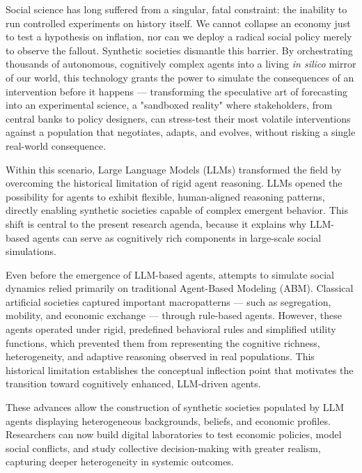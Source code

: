 

Social science has long suffered from a singular, fatal constraint: the inability to run controlled experiments on history itself. We cannot collapse an economy just to test a hypothesis on inflation, nor can we deploy a radical social policy merely to observe the fallout. Synthetic societies dismantle this barrier. By orchestrating thousands of autonomous, cognitively complex agents into a living \textit{in silico} mirror of our world, this technology grants the power to simulate the consequences of an intervention before it happens — transforming the speculative art of forecasting into an experimental science, a "sandboxed reality" where stakeholders, from central banks to policy designers, can stress-test their most volatile interventions against a population that negotiates, adapts, and evolves, without risking a single real-world consequence.

Within this scenario, Large Language Models (LLMs) transformed the field by overcoming the historical limitation of rigid agent reasoning. LLMs opened the possibility for agents to exhibit flexible, human-aligned reasoning patterns, directly enabling synthetic societies capable of complex emergent behavior. This shift is central to the present research agenda, because it explains why LLM-based agents can serve as cognitively rich components in large-scale social simulations.

Even before the emergence of LLM-based agents, attempts to simulate social dynamics relied primarily on traditional Agent-Based Modeling (ABM). Classical artificial societies captured important macropatterns — such as segregation, mobility, and economic exchange — through rule-based agents. However, these agents operated under rigid, predefined behavioral rules and simplified utility functions, which prevented them from representing the cognitive richness, heterogeneity, and adaptive reasoning observed in real populations. This historical limitation establishes the conceptual inflection point that motivates the transition toward cognitively enhanced, LLM-driven agents.

These advances allow the construction of synthetic societies populated by LLM agents displaying heterogeneous backgrounds, beliefs, and economic profiles. Researchers can now build digital laboratories to test economic policies, model social conflicts, and study collective decision-making with greater realism, capturing deeper heterogeneity in systemic outcomes.

